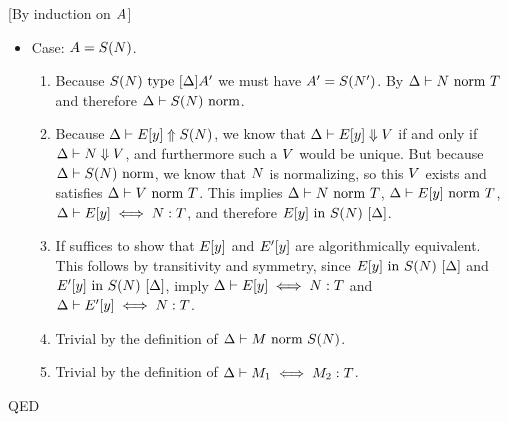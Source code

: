 \documentclass{article}
\theoremstyle{break}
\newcommand{\qed}{\mbox{QED}}
\newenvironment{proof}{\noindent{\bf Proof:}\hspace*{0.5em}}{\hspace*{\fill}\qed}
\begin{document}
\begin{proof}[By induction on $A$]
\begin{itemize}
\item Case: $A=S(N)$.
\begin{enumerate}
\item Because ${S(N)}\mathrm{\ type\ }[\Delta]{A'}$ we must
have $A'=S(N')$.  By 
${\Delta}\vdash{N}\mbox{\ norm\ }{T}$ and therefore
${\Delta}\vdash{S(N)}\mbox{\ norm}$.
\item Because $\Delta\vdash E[y] \Uparrow S(N)$, we
know that $\Delta\vdash E[y] \Downarrow V$ if
and only if
$\Delta\vdash N \Downarrow V$, and
furthermore such a $V$ would be unique.  But because
${\Delta}\vdash{S(N)}\mbox{\ norm}$, we know that
$N$ is normalizing, so this $V$ exists and
satisfies ${\Delta}\vdash{V}\mbox{\ norm\ }{T}$.  This implies
${\Delta}\vdash{N}\mbox{\ norm\ }{T}$,
${\Delta}\vdash{E[y]}\mbox{\ norm\ }{T}$,
$\Delta\vdash E[y] \iff N : T$, and
therefore ${E[y]}\mathrm{\ in\ }{S(N)}\ [\Delta]$.
\item If suffices to show that $E[y]$ and $E'[y]$ are
algorithmically equivalent.  This follows by transitivity
and symmetry, since
${E[y]}\mathrm{\ in\ }{S(N)}\ [\Delta]$ and
${E'[y]}\mathrm{\ in\ }{S(N)}\ [\Delta]$,
imply $\Delta\vdash E[y] \iff N : T$ and
$\Delta\vdash E'[y] \iff N : T$.
\item Trivial by the definition of 
${\Delta}\vdash{M}\mbox{\ norm\ }{S(N)}$.
\item Trivial by the definition of 
$\Delta\vdash M_1 \iff M_2 : T$.
\end{enumerate}


\end{itemize}
\end{proof}
\end{document}
